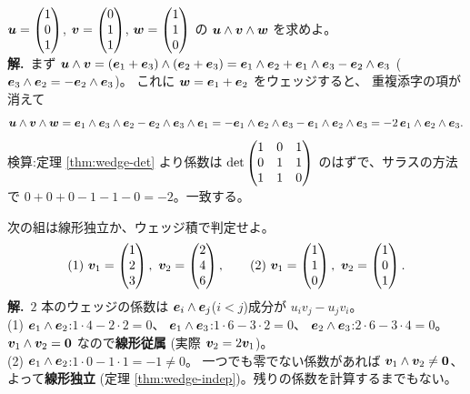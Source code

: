 \begin{rei}[例題・基本($3$ 本のウェッジ)]\label{rei:wedge-triple}
$\bm{u} = \begin{pmatrix}1 \\ 0 \\ 1\end{pmatrix}$, $\bm{v} = \begin{pmatrix}0 \\ 1 \\ 1\end{pmatrix}$,
$\bm{w} = \begin{pmatrix}1 \\ 1 \\ 0\end{pmatrix}$ の
$\bm{u} \wedge \bm{v} \wedge \bm{w}$ を求めよ。\\
\textbf{解.}\ まず
$\bm{u} \wedge \bm{v} = (\bm{e}_1 + \bm{e}_3) \wedge
(\bm{e}_2 + \bm{e}_3)
= \bm{e}_1 \wedge \bm{e}_2 + \bm{e}_1 \wedge \bm{e}_3
- \bm{e}_2 \wedge \bm{e}_3$
($\bm{e}_3 \wedge \bm{e}_2 = -\bm{e}_2 \wedge \bm{e}_3$)。
これに $\bm{w} = \bm{e}_1 + \bm{e}_2$ をウェッジすると、
重複添字の項が消えて
\[
\bm{u} \wedge \bm{v} \wedge \bm{w}
= \bm{e}_1 \wedge \bm{e}_3 \wedge \bm{e}_2
- \bm{e}_2 \wedge \bm{e}_3 \wedge \bm{e}_1
= -\bm{e}_1 \wedge \bm{e}_2 \wedge \bm{e}_3
- \bm{e}_1 \wedge \bm{e}_2 \wedge \bm{e}_3
= -2\,\bm{e}_1 \wedge \bm{e}_2 \wedge \bm{e}_3.
\]
検算:定理 \ref{thm:wedge-det} より係数は
$\det\begin{pmatrix}1 & 0 & 1 \\ 0 & 1 & 1 \\ 1 & 1 & 0\end{pmatrix}$ のはずで、サラスの方法で
$0 + 0 + 0 - 1 - 1 - 0 = -2$。一致する。
\end{rei}

\begin{rei}[例題・標準(独立性のウェッジ判定)]\label{rei:wedge-indep2}
次の組は線形独立か、ウェッジ積で判定せよ。
\[
(1)\ \bm{v}_1 = \begin{pmatrix}1 \\ 2 \\ 3\end{pmatrix},\ \bm{v}_2 = \begin{pmatrix}2 \\ 4 \\ 6\end{pmatrix},
\qquad
(2)\ \bm{v}_1 = \begin{pmatrix}1 \\ 1 \\ 0\end{pmatrix},\ \bm{v}_2 = \begin{pmatrix}1 \\ 0 \\ 1\end{pmatrix}.
\]
\textbf{解.}\ $2$ 本のウェッジの係数は
$\bm{e}_i \wedge \bm{e}_j$($i < j$)成分が $u_i v_j - u_j v_i$。\\
(1) $\bm{e}_1 \wedge \bm{e}_2$:$1 \cdot 4 - 2 \cdot 2 = 0$、
$\bm{e}_1 \wedge \bm{e}_3$:$1 \cdot 6 - 3 \cdot 2 = 0$、
$\bm{e}_2 \wedge \bm{e}_3$:$2 \cdot 6 - 3 \cdot 4 = 0$。
$\bm{v}_1 \wedge \bm{v}_2 = \bm{0}$ なので\textbf{線形従属}
(実際 $\bm{v}_2 = 2\bm{v}_1$)。\\
(2) $\bm{e}_1 \wedge \bm{e}_2$:$1 \cdot 0 - 1 \cdot 1 = -1 \neq 0$。
一つでも零でない係数があれば
$\bm{v}_1 \wedge \bm{v}_2 \neq \bm{0}$、よって\textbf{線形独立}
(定理 \ref{thm:wedge-indep})。残りの係数を計算するまでもない。
\end{rei}

